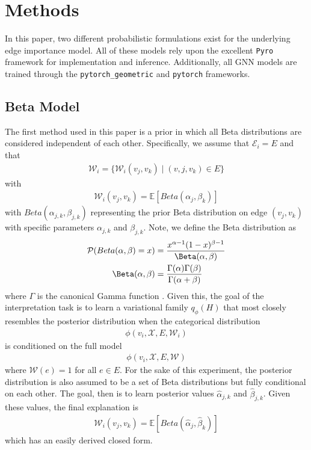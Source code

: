 \section{Methods}
In this paper, two different probabilistic formulations exist for the underlying edge importance model. All of these models rely upon the excellent \verb|Pyro| \cite{bingham_pyro_2018} framework for implementation and inference. Additionally, all GNN models are trained through the \verb|pytorch_geometric| \cite{fey_fast_2019} and \verb|pytorch| \cite{paszke_pytorch_2019} frameworks.

\subsection{Beta Model}
The first method used in this paper is a prior in which all Beta distributions are considered independent of each other. Specifically, we assume that $\mathcal{E}_i = E$ and that
\begin{align*}
	\mathcal{W}_i = \{\mathcal{W}_i(v_j , v_k) \mid (v,j, v_k) \in E\}
\end{align*}
with
\begin{align*}
	\mathcal{W}_i(v_j, v_k) = \mathbb{E}[Beta(\alpha_{j}, \beta_{k})]
\end{align*}
with $Beta(\alpha_{j,k}, \beta_{j, k})$ representing the prior Beta distribution on edge $(v_j, v_k)$ with specific parameters $\alpha_{j,k}$ and $\beta_{j,k}$. Note, we define the Beta distribution as
\begin{align*}
	\mathcal{P}(Beta(\alpha, \beta) = x) &= \frac{x^{\alpha - 1}(1-x)^{\beta - 1}}{\Beta(\alpha, \beta)} \\
	\Beta(\alpha, \beta) &= \frac{\Gamma(\alpha)\Gamma(\beta)}{\Gamma(\alpha + \beta)}
\end{align*}
where $\Gamma$ is the canonical Gamma function \cite{noauthor_continuous_nodate}. Given this, the goal of the interpretation task is to learn a variational family $q_{\phi}(H)$ that most closely resembles the posterior distribution when the categorical distribution
\begin{align*}
	\phi(v_i, \mathcal{X}, E, \mathcal{W}_i)
\end{align*}
is conditioned on the full model
\begin{align*}
	\phi(v_i, \mathcal{X}, E, \mathcal{W})
\end{align*}
where $\mathcal{W}(e) = 1$ for all $e \in E$. For the sake of this experiment, the posterior distribution is also assumed to be a set of Beta distributions but fully conditional on each other. The goal, then is to learn posterior values $\hat{\alpha}_{j,k}$ and $\hat{\beta}_{j,k}$. Given these values, the final explanation is
\begin{align*}
	\mathcal{W}_i(v_j, v_k) = \mathbb{E}[Beta(\hat{\alpha}_{j}, \hat{\beta}_{k})]
\end{align*}
which has an easily derived closed form.

